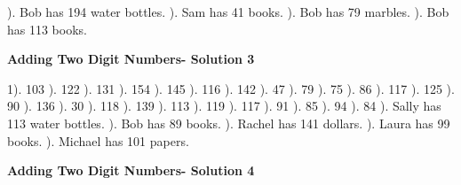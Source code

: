\documentclass{article}%
\begin{document}
). Bob has 194 water bottles.%
). Sam has 41 books.%
). Bob has 79 marbles.%
). Bob has 113 books.%
\newline%
\newpage%
\large%
\begin{center}%
\textbf{Adding Two Digit Numbers- Solution 3}%
\newline%
\end{center} \normalsize%
1). 103%
). 122%
). 131%
). 154%
). 145%
). 116%
). 142%
). 47%
). 79%
). 75%
). 86%
). 117%
). 125%
). 90%
). 136%
). 30%
). 118%
). 139%
). 113%
). 119%
). 117%
). 91%
). 85%
). 94%
). 84%
). Sally has 113 water bottles.%
). Bob has 89 books.%
). Rachel has 141 dollars.%
). Laura has 99 books.%
). Michael has 101 papers.%
\newline%
\newpage%
\large%
\begin{center}%
\textbf{Adding Two Digit Numbers- Solution 4}%
\newline%
\end{center} \normalsize%
\end{document}
